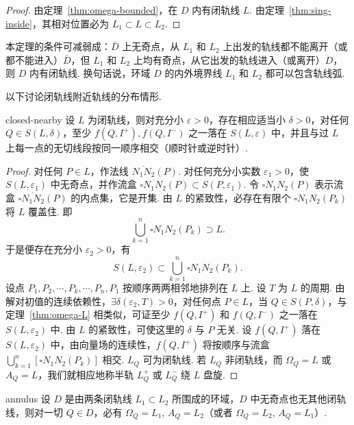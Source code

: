 \begin{proof}
由定理~\ref{thm:omega-bounded}，在 $D$ 内有闭轨线 $L$. 由定理~\ref{thm:sing-inside}，其相对位置必为 $L_1 \subset L \subset L_2$.
\end{proof}

本定理的条件可减弱成：$\bar D$ 上无奇点，从 $L_1$ 和 $L_2$ 上出发的轨线都不能离开（或都不能进入）$\bar D$，但 $L_1$ 和 $L_2$ 上均有奇点，从它出发的轨线进入（或离开）$D$，则 $D$ 内有闭轨线. 换句话说，环域 $D$ 的内外境界线 $L_1$ 和 $L_2$ 都可以包含轨线弧.

以下讨论闭轨线附近轨线的分布情形.

\begin{theorem}{}{closed-nearby}
设 $L$ 为闭轨线，则对充分小 $\varepsilon > 0$，存在相应适当小 $\delta > 0$，对任何 $Q \in S(L, \delta)$，至少 $f(Q, I^+), f(Q, I^-)$ 之一落在 $S(L, \varepsilon)$ 中，并且与过 $L$ 上每一点的无切线段按同一顺序相交（顺时针或逆时针）.
\end{theorem}

\begin{proof}
对任何 $P \in L$，作法线 $\overline{N_1N_2}(P)$. 对任何充分小实数 $\varepsilon_1 > 0$，使 $S(L, \varepsilon_1)$ 中无奇点，并作流盒 $\square \overline{N_1N_2}(P) \subset S(P, \varepsilon_1)$. 令 $\square N_1N_2(P)$ 表示流盒 $\square \overline{N_1N_2}(P)$ 的内点集，它是开集. 由 $L$ 的紧致性，必存在有限个 $\square N_1N_2(P_k)$ 将 $L$ 覆盖住. 即
\[
\bigcup_{k=1}^n \square N_1N_2(P_k) \supset L.
\]
于是便存在充分小 $\varepsilon_2 > 0$，有
\[
S(L, \varepsilon_2) \subset \bigcup_{k=1}^n \square N_1N_2(P_k).
\]
设点 $P_1, P_2, \cdots, P_k, \cdots, P_n, P_1$ 按顺序两两相邻地排列在 $L$ 上. 设 $T$ 为 $L$ 的周期. 由解对初值的连续依赖性，$\exists \delta(\varepsilon_2, T) > 0$，对任何点 $P \in L$，当 $Q \in S(P, \delta)$，与定理~\ref{thm:omega-L} 相类似，可证至少 $f(Q, I^+)$ 和 $f(Q, I^-)$ 之一落在 $S(L, \varepsilon_2)$ 中. 由 $L$ 的紧致性，可使这里的 $\delta$ 与 $P$ 无关. 设 $f(Q, I^+)$ 落在 $S(L, \varepsilon_2)$ 中，由向量场的连续性，$f(Q, I^+)$ 将按顺序与流盒 $\bigcup_{k=1}^n [\square N_1N_2(P_k)]$ 相交. $L_Q$ 可为闭轨线. 若 $L_Q$ 非闭轨线，而 $\Omega_Q = L$ 或 $A_Q = L$，我们就相应地称半轨 $L_Q^+$ 或 $L_Q^-$ 绕 $L$ 盘旋.
\end{proof}

\begin{theorem}{}{annulus}
设 $D$ 是由两条闭轨线 $L_1 \subset L_2$ 所围成的环域，$D$ 中无奇点也无其他闭轨线，则对一切 $Q \in D$，必有 $\Omega_Q = L_1$, $A_Q = L_2$（或者 $\Omega_Q = L_2$, $A_Q = L_1$）.
\end{theorem}

